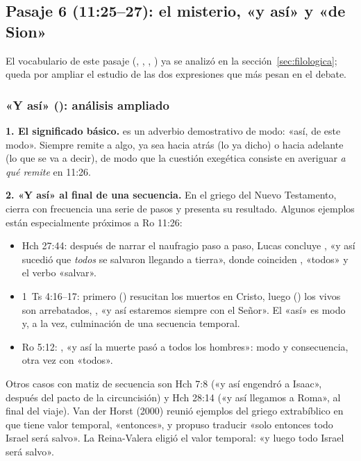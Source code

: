 \subsection{Pasaje 6 (11:25--27): el misterio, «y así» y «de Sion»}

El vocabulario de este pasaje (, , , ) ya se analizó en la sección~\ref{sec:filologica}; queda por ampliar el estudio de las dos expresiones que más pesan en el debate.

\subsubsection*{«Y así» (): análisis ampliado}

\textbf{1. El significado básico.}  es un adverbio demostrativo de modo: «así, de este modo». Siempre remite a algo, ya sea hacia atrás (lo ya dicho) o hacia adelante (lo que se va a decir), de modo que la cuestión exegética consiste en averiguar \emph{a qué remite} en 11:26.

\textbf{2. «Y así» al final de una secuencia.} En el griego del Nuevo Testamento,  cierra con frecuencia una serie de pasos y presenta su resultado. Algunos ejemplos están especialmente próximos a Ro 11:26:
\begin{itemize}
\item Hch 27:44: después de narrar el naufragio paso a paso, Lucas concluye , «y así sucedió que \emph{todos} se salvaron llegando a tierra», donde coinciden , «todos» y el verbo «salvar».
\item 1~Ts 4:16--17: primero () resucitan los muertos en Cristo, luego () los vivos son arrebatados, , «y así estaremos siempre con el Señor». El «así» es modo y, a la vez, culminación de una secuencia temporal.
\item Ro 5:12: , «y así la muerte pasó a todos los hombres»: modo y consecuencia, otra vez con «todos».
\end{itemize}
Otros casos con matiz de secuencia son Hch 7:8 («y así engendró a Isaac», después del pacto de la circuncisión) y Hch 28:14 («y así llegamos a Roma», al final del viaje). Van der Horst (2000) reunió ejemplos del griego extrabíblico en que  tiene valor temporal, «entonces», y propuso traducir «solo entonces todo Israel será salvo». La Reina-Valera eligió el valor temporal: «y luego todo Israel será salvo».

